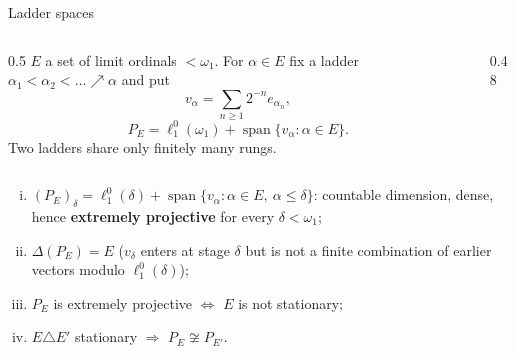 \documentclass[10pt,aspectratio=169]{beamer}
\newcommand{\lo}[1]{\ell_1^0(#1)}
\newcommand{\Lin}{\operatorname{span}}
\begin{document}
\begin{frame}{Ladder spaces}
  \begin{columns}[c,onlytextwidth]
    \begin{column}{0.5\textwidth}
      $E$ a set of limit ordinals $<\omega_1$. For $\alpha\in E$ fix a ladder
      $\alpha_1<\alpha_2<\dots\nearrow\alpha$ and put
      \[
        v_\alpha=\sum_{n\ge1}2^{-n}e_{\alpha_n},
      \]
      \[
        P_E=\lo{\omega_1}+\Lin\{v_\alpha:\alpha\in E\}.
      \]
      Two ladders share only finitely many rungs.
    \end{column}
    \begin{column}{0.48\textwidth}
      \centering
    \end{column}
  \end{columns}
  \begin{theorem}
    \begin{enumerate}[(i)]
      \item $(P_E)_\delta=\lo\delta+\Lin\{v_\alpha:\alpha\in E,\ \alpha\le\delta\}$:
        countable dimension, dense, hence \textbf{extremely projective} for every $\delta<\omega_1$;
      \item $\Delta(P_E)=E$ \quad ($v_\delta$ enters at stage $\delta$ but is not a
        finite combination of earlier vectors modulo $\lo\delta$);
      \item $P_E$ is extremely projective $\iff$ $E$ is not stationary;
      \item $E\triangle E'$ stationary $\Rightarrow$ $P_E\not\cong P_{E'}$.
    \end{enumerate}
  \end{theorem}
\end{frame}
\end{document}
